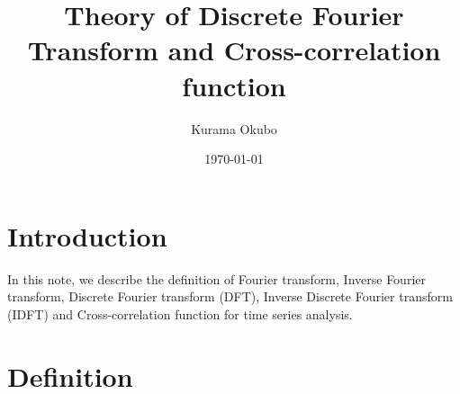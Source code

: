 \documentclass{proposal}
\title{Theory of Discrete Fourier Transform and Cross-correlation function} %
\author{Kurama Okubo} %
\date{\today} %
\begin{document}
\maketitle

\section{Introduction}
In this note, we describe the definition of Fourier transform, Inverse Fourier transform, Discrete Fourier transform (DFT), Inverse Discrete Fourier transform (IDFT) and Cross-correlation function for time series analysis.
 
\section{Definition}
\end{document}
